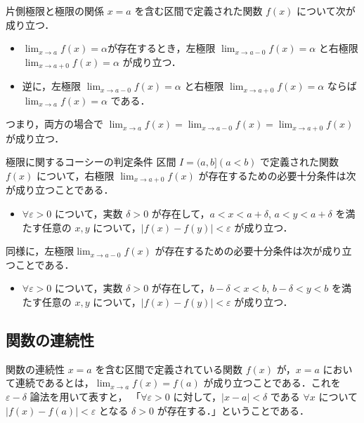 \documentclass[xelatex,ja=standard,jafont=noto]{bxjsarticle}
\begin{document}
  \begin{theorem}{片側極限と極限の関係}{}
    $x = a$ を含む区間で定義された関数 $f(x)$ について次が成り立つ．
    \begin{itemize}
     \item $\lim_{x \to a} f(x) = \alpha$が存在するとき，左極限 $\lim_{x \to a -0} f(x) = \alpha$ と右極限 $\lim_{x \to a + 0} f(x) = \alpha$ が成り立つ．
     \item 逆に，左極限 $\lim_{x \to a -0} f(x) = \alpha$ と右極限 $\lim_{x \to a + 0} f(x) = \alpha$ ならば $\lim_{x \to a} f(x) = \alpha$ である．
    \end{itemize}
    つまり，両方の場合で $\lim_{x \to a} f(x) = \lim_{x \to a - 0} f(x) = \lim_{x \to a+0} f(x)$ が成り立つ．
  \end{theorem}

  \begin{theorem}{極限に関するコーシーの判定条件}{}
    区間 $I = (a, b] (a < b)$ で定義された関数 $f(x)$ について，右極限 $\lim_{x \to a+0} f(x)$ が存在するための必要十分条件は次が成り立つことである．
    \begin{itemize}
      \item $\forall \varepsilon > 0$ について，実数 $\delta > 0$ が存在して，$a < x < a + \delta$, $a < y < a + \delta$ を満たす任意の $x, y$ について，$|f(x) - f(y)| < \varepsilon$ が成り立つ．
    \end{itemize}
    同様に，左極限$\lim_{x \to a-0} f(x)$ が存在するための必要十分条件は次が成り立つことである．
    \begin{itemize}
      \item $\forall \varepsilon > 0$ について，実数 $\delta > 0$ が存在して，$b-\delta < x < b$, $b-\delta < y < b$ を満たす任意の $x, y$ について，$|f(x) - f(y)| < \varepsilon$ が成り立つ．
    \end{itemize}
  \end{theorem}

  \subsection{関数の連続性}
  \begin{tcb}{関数の連続性}{}
    $x = a$ を含む区間で定義されている関数 $f(x)$ が，$x = a$ において連続であるとは，$\lim_{x \to a} f(x) = f(a)$ が成り立つことである．これを $\varepsilon - \delta$ 論法を用いて表すと，
    「$\forall \varepsilon > 0$ に対して，$|x - a| < \delta$ である $\forall x$  について $|f(x) - f(a)| < \varepsilon$ となる $\delta > 0$ が存在する．」ということである．
  \end{tcb}
\end{document}
